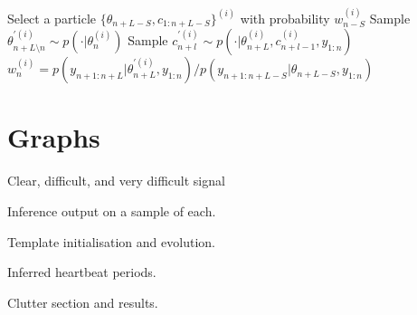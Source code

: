 \documentclass{article}
\begin{document}
\begin{algorithm}
\begin{algorithmic}
      \STATE Select a particle $\{\theta_{n+L-S}, c_{1:n+L-S}\}^{(i)}$ with probability $w_{n-S}^{(i)}$
      \STATE Sample $\theta_{n+L \setminus n}^{'(i)} \sim p(\cdot|\theta_n^{(i)})$
        \STATE Sample $c_{n+l}^{'(i)} \sim p(\cdot|\theta_{n+L}^{(i)}, c_{n+l-1}^{(i)}, y_{1:n})$
      \ENDFOR
      \STATE $w_n^{(i)} = p(y_{n+1:n+L}|\theta_{n+L}^{'(i)}, y_{1:n})/p(y_{n+1:n+L-S}|\theta_{n+L-S}, y_{1:n})$
    \ENDFOR
  \ENDFOR
\end{algorithmic}
\end{algorithm}



\section{Graphs}

Clear, difficult, and very difficult signal

Inference output on a sample of each.

Template initialisation and evolution.

Inferred heartbeat periods.

Clutter section and results.





\end{document}
